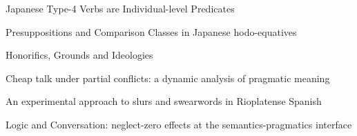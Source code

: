 \documentclass[12pt]{jarticle}
\begin{document}
      {Japanese Type-4 Verbs are Individual-level Predicates}
      {}
  
      {Presuppositions and Comparison Classes in Japanese hodo-equatives}
      {}




  
      {Honorifics, Grounds and Ideologies}
      {}
  
      {Cheap talk under partial conflicts: a dynamic analysis of pragmatic meaning}
      {}
  
      {An experimental approach to slurs and swearwords in Rioplatense Spanish}
      {}




  
      {Logic and Conversation: neglect-zero effects at the semantics-pragmatics interface}
      {}







  
\end{document}

